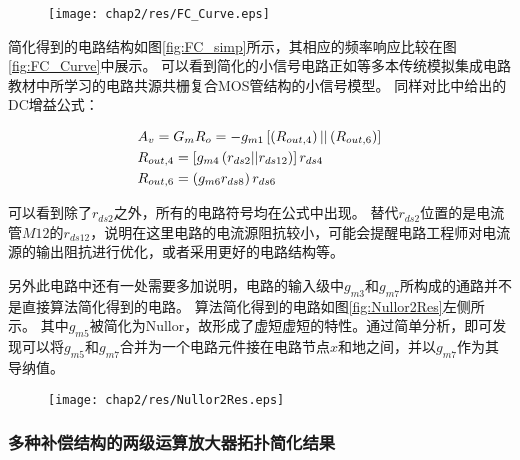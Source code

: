 \begin{figure}[!htp]
	\centering
	\texttt{[image: chap2/res/FC\_Curve.eps]}
\end{figure}

简化得到的电路结构如图\ref{fig:FC_simp}所示，其相应的频率响应比较在图\ref{fig:FC_Curve}中展示。
可以看到简化的小信号电路正如\parencite{GRAY-Analog,Allen-Analog}等多本传统模拟集成电路教材中所学习的电路共源共栅复合MOS管结构的小信号模型。
同样对比\parencite{GRAY-Analog}中给出的DC增益公式：

\begin{equation}
\begin{gathered}
{A_v} = {G_m}{R_o} =  - {g_{m1}}\left[ {\left( {{R_{out,4}}} \right)||\left( {{R_{out,6}}} \right)} \right] \hfill \\
{R_{out,4}} = \left[ {{g_{m4}}\left( {{r_{ds2}}||{r_{ds12}}} \right)} \right]{r_{ds4}} \hfill \\
{R_{out,6}} = \left( {{g_{m6}}{r_{ds8}}} \right){r_{ds6}} \hfill \\ 
\end{gathered}
\end{equation}

可以看到除了$r_{ds2}$之外，所有的电路符号均在公式中出现。
替代$r_{ds2}$位置的是电流管$M12$的$r_{ds12}$，说明在这里电路的电流源阻抗较小，可能会提醒电路工程师对电流源的输出阻抗进行优化，或者采用更好的电路结构等。

另外此电路中还有一处需要多加说明，电路的输入级中$g_{m3}$和$g_{m7}$所构成的通路并不是直接算法简化得到的电路。
算法简化得到的电路如图\ref{fig:Nullor2Res}左侧所示。
其中$g_{m5}$被简化为Nullor，故形成了虚短虚短的特性。通过简单分析，即可发现可以将$g_{m5}$和$g_{m7}$合并为一个电路元件接在电路节点$x$和地之间，并以$g_{m7}$作为其导纳值。

\begin{figure}[!htp]
	\centering
	\texttt{[image: chap2/res/Nullor2Res.eps]}
\end{figure}

\subsubsection{多种补偿结构的两级运算放大器拓扑简化结果}
\label{subsubsec:simp:res:cir:ts}

